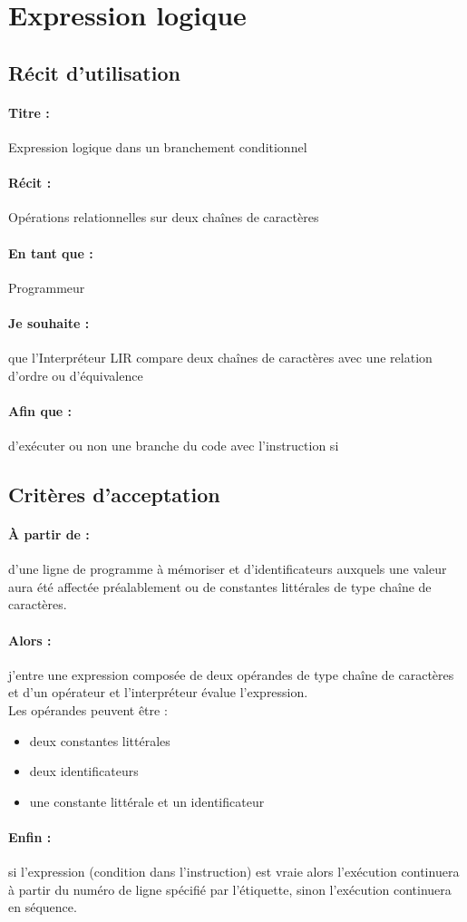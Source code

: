     \section{Expression logique}

    \subsection*{Récit d'utilisation}

    \paragraph{Titre : } Expression logique dans un branchement
    conditionnel
    \paragraph{Récit : } Opérations relationnelles sur deux chaînes de
    caractères
    \paragraph{En tant que : } Programmeur
    \paragraph{Je souhaite : } que l'Interpréteur LIR compare deux
    chaînes de caractères avec une relation d'ordre ou d'équivalence
    \paragraph{Afin que : } d'exécuter ou non une branche du code avec
    l'instruction si
    \newpage

    \subsection*{Critères d'acceptation}

    \paragraph{À partir de : } d'une ligne de programme à mémoriser et d'identificateurs auxquels une valeur aura été affectée préalablement
    ou de constantes littérales de type chaîne de caractères.

    \paragraph{Alors : } j'entre une expression composée de deux
    opérandes de type chaîne de caractères et d'un opérateur et l'interpréteur
    évalue l'expression.
    \\ Les opérandes peuvent être :
    \begin{itemize}
        \item deux constantes littérales
        \item deux identificateurs
        \item une constante littérale et un identificateur
    \end{itemize}

    \paragraph{Enfin : } si l'expression (condition dans l'instruction)
    est vraie alors l'exécution continuera à partir du numéro de ligne
    spécifié par l’étiquette, sinon l'exécution continuera en séquence.


